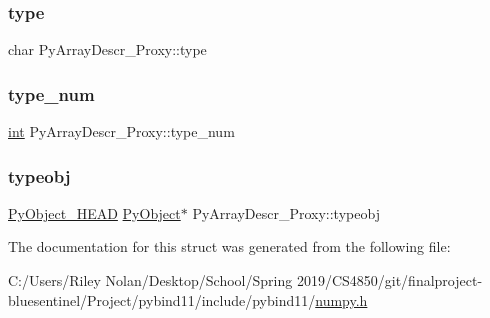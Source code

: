 \subsubsection{\texorpdfstring{type}{type}}
{\footnotesize\ttfamily char Py\+Array\+Descr\+\_\+\+Proxy\+::type}

\mbox{\label{struct_py_array_descr___proxy_a5af00ff8ffab1568bc306598d57a09c9}} 
\subsubsection{\texorpdfstring{type\_num}{type\_num}}
{\footnotesize\ttfamily \mbox{\hyperlink{warnings_8h_a74f207b5aa4ba51c3a2ad59b219a423b}{int}} Py\+Array\+Descr\+\_\+\+Proxy\+::type\+\_\+num}

\mbox{\label{struct_py_array_descr___proxy_aa8fe65eb0a7bfd03529b30482650b14d}} 
\subsubsection{\texorpdfstring{typeobj}{typeobj}}
{\footnotesize\ttfamily \mbox{\hyperlink{_python27_2object_8h_a0bf35c1f3ea13f925de94d8593db3b7e}{Py\+Object\+\_\+\+H\+E\+AD}} \mbox{\hyperlink{_python27_2object_8h_aadc84ac7aed2cfa6f20c25f62bf3dac7}{Py\+Object}}$\ast$ Py\+Array\+Descr\+\_\+\+Proxy\+::typeobj}



The documentation for this struct was generated from the following file\+:\begin{DoxyCompactItemize}
\item 
C\+:/\+Users/\+Riley Nolan/\+Desktop/\+School/\+Spring 2019/\+C\+S4850/git/finalproject-\/bluesentinel/\+Project/pybind11/include/pybind11/\mbox{\hyperlink{numpy_8h}{numpy.\+h}}\end{DoxyCompactItemize}
